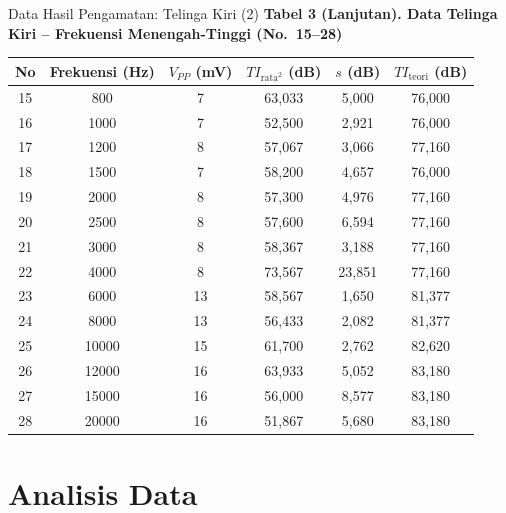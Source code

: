 \documentclass[aspectratio=169, 10pt]{beamer}
\begin{document}
	\begin{frame}{Data Hasil Pengamatan: Telinga Kiri (2)}
		\scriptsize
		\textbf{Tabel 3 (Lanjutan). Data Telinga Kiri -- Frekuensi Menengah-Tinggi (No.\ 15--28)}
		\vspace{0.1cm}
		\begin{tabular}{cccccc}
			\toprule
			No & Frekuensi (Hz) & $V_{PP}$ (mV) & $TI_{\text{rata}^2}$ (dB) & $s$ (dB) & $TI_{\text{teori}}$ (dB) \\
			\midrule
			15 & 800    & 7  & 63{,}033 & 5{,}000  & 76{,}000 \\
			16 & 1000   & 7  & 52{,}500 & 2{,}921  & 76{,}000 \\
			17 & 1200   & 8  & 57{,}067 & 3{,}066  & 77{,}160 \\
			18 & 1500   & 7  & 58{,}200 & 4{,}657  & 76{,}000 \\
			19 & 2000   & 8  & 57{,}300 & 4{,}976  & 77{,}160 \\
			20 & 2500   & 8  & 57{,}600 & 6{,}594  & 77{,}160 \\
			21 & 3000   & 8  & 58{,}367 & 3{,}188  & 77{,}160 \\
			22 & 4000   & 8  & 73{,}567 & 23{,}851 & 77{,}160 \\
			23 & 6000   & 13 & 58{,}567 & 1{,}650  & 81{,}377 \\
			24 & 8000   & 13 & 56{,}433 & 2{,}082  & 81{,}377 \\
			25 & 10000  & 15 & 61{,}700 & 2{,}762  & 82{,}620 \\
			26 & 12000  & 16 & 63{,}933 & 5{,}052  & 83{,}180 \\
			27 & 15000  & 16 & 56{,}000 & 8{,}577  & 83{,}180 \\
			28 & 20000  & 16 & 51{,}867 & 5{,}680  & 83{,}180 \\
			\bottomrule
		\end{tabular}
	\end{frame}

	\section{Analisis Data}
\end{document}
